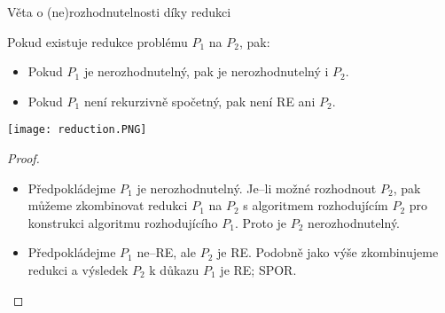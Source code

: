     \begin{frame}{Věta o (ne)rozhodnutelnosti díky redukci}
    \begin{minipage}{0.57\textwidth}
    \begin{theorem}[Redukce]
    Pokud existuje redukce problému $P_1$ na $P_2$, pak:
    \begin{itemize}%
        \item Pokud $P_1$ je nerozhodnutelný, pak je nerozhodnutelný i $P_2$. 
        \item Pokud $P_1$ není rekurzivně spočetný, pak není RE ani $P_2$. 
    \end{itemize}
    \end{theorem}
    \end{minipage}
    \begin{minipage}{0.01\textwidth}
    \end{minipage}
    \begin{minipage}{0.41\textwidth}
    \texttt{[image: reduction.PNG]}
    \end{minipage}
    \begin{proof}
    \begin{itemize}%
        \item Předpokládejme $P_1$ je nerozhodnutelný. Je--li možné rozhodnout $P_2$, pak můžeme zkombinovat redukci  $P_1$ na $P_2$ s algoritmem rozhodujícím $P_2$ pro konstrukci algoritmu rozhodujícího $P_1$. Proto je $P_2$ nerozhodnutelný.
        \item Předpokládejme $P_1$ ne--RE, ale $P_2$ je RE. Podobně jako výše zkombinujeme redukci a výsledek $P_2$  k důkazu $P_1$ je RE; SPOR.
    \end{itemize}
    \end{proof}
    \end{frame}
    
